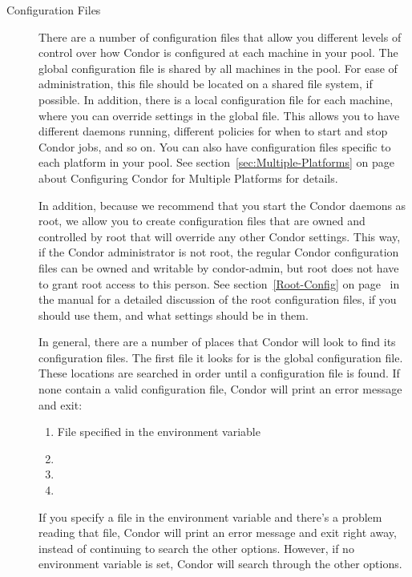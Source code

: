 \begin{description}
\item[Configuration Files] There are a number of configuration files
that allow you
different levels of control over how Condor is configured at each
machine in your pool.  
The global configuration file is shared by all machines in the pool.
For ease of administration, this file should be located on a shared
file system, if possible.
In addition, there is a local
configuration file for each machine, where you can override settings in the
global file.  This allows you to have different daemons running,
different policies for when to start and stop Condor jobs, and so on.
You can also have configuration files specific to each platform in your pool.
See
section~\ref{sec:Multiple-Platforms} on
page~\pageref{sec:Multiple-Platforms} about Configuring Condor for
Multiple Platforms for details.

In addition, because we recommend that you start the Condor daemons as
root, we allow you to create configuration files that are owned and
controlled by root that will override any other Condor settings.  This
way, if the Condor administrator is not root, the regular Condor configuration
files can be owned and writable by condor-admin, but root does not have
to grant root access to this person.  See
section~\ref{Root-Config} on page~\pageref{Root-Config} in the
manual for a detailed discussion of the root configuration files, if you
should use them, and what settings should be in them.

In general, there are a number of places that Condor will look to find
its configuration files.  The first file it looks for is the global configuration
file.  These locations are searched in order until a configuration file is
found.  If none contain a valid configuration file, Condor will print an
error message and exit:
\begin{enumerate}
   \item File specified in the  environment variable
   \item {}
   \item {}
   \item {}
\end{enumerate}

If you specify a file in the  environment variable
and there's a problem reading that file, Condor will print an error
message and exit right away, instead of continuing to search the other
options.
However, if no  environment variable is set,
Condor will search through the other options.


\end{description}
